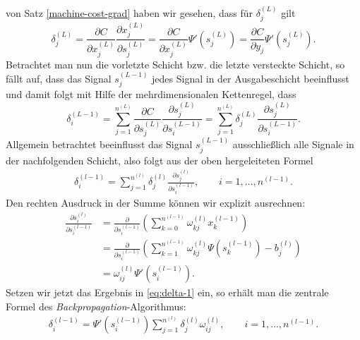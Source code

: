 von Satz \ref{machine-cost-grad} haben wir gesehen, dass für $\delta_j^{(L)}$ gilt
\[
    \delta_j^{(L)}= \frac{\partial C}{\partial x_j^{(L)}} \frac{\partial x_j^{(L)}}{\partial s_j^{(L)}}= \frac{\partial C}{\partial x_j^{(L)}} \Psi '(s_j^{(L)})
    =\frac{\partial C}{\partial y_j} \Psi '(s_j^{(L)}).
\]
Betrachtet man nun die vorletzte Schicht bzw. die letzte versteckte Schicht, so fällt auf, dass das Signal
$s_j^{(L-1)}$ jedes Signal in der Ausgabeschicht beeinflusst und damit folgt mit Hilfe der mehrdimensionalen
Kettenregel, dass
\[
    \delta_i^{(L-1)}= \sum\limits_{j=1}^{n^{(L)}} \frac{\partial C}{\partial s_j^{(L)}}
    \frac{\partial s_j^{(L)}}{\partial s_i^{(L-1)}}
    = \sum\limits_{j=1}^{n^{(L)}} \delta_j^{(L)} \frac{\partial s_j^{(L)}}{\partial s_i^{(L-1)}}.
\]
Allgemein betrachtet beeinflusst das Signal $s_j^{(L-1)}$ ausschließlich alle Signale in der nachfolgenden Schicht,
also folgt aus der oben hergeleiteten Formel
\begin{align}
    \delta_i^{(l-1)}= \sum\limits_{j=1}^{n^{(l)}} \delta_j^{(l)} \frac{\partial s_j^{(l)}}{\partial s_i^{(l-1)}},
    \qquad i = 1, \dots, n^{(l-1)}. \label{eq:delta-1}
\end{align}
Den rechten Ausdruck in der Summe können wir explizit ausrechnen:
\begin{align*}
    \frac{\partial s_i^{(l)}}{\partial s_i^{(l-1)}}
    &= \frac{\partial}{\partial s_i^{(l-1)}} (\sum\limits_{k=0}^{n^{(l-1)}}\omega_{kj}^{(l)}x_{k}^{(l-1)})\\
    &= \frac{\partial}{\partial s_i^{(l-1)}} (\sum\limits_{k=1}^{n^{(l-1)}}\omega_{kj}^{(l)}\Psi(s_{k}^{(l-1)}) - b_j^{(l)}) \\
    &= \omega_{ij}^{(l)}\Psi'(s_i^{(l-1)}).
\end{align*}
Setzen wir jetzt das Ergebnis in \eqref{eq:delta-1} ein, so erhält man die zentrale Formel des
\textit{Backpropagation}-Algorithmus:
\begin{align}
    \delta_i^{(l-1)} = \Psi'(s_i^{(l-1)})\sum\limits_{j=1}^{n^{(l)}} \delta_j^{(l)}\omega_{ij}^{(l)},
    \qquad  i = 1, \dots, n^{(l-1)}. \label{eq:delta-final}
\end{align}

